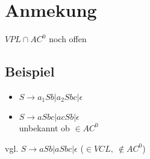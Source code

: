\section{Anmekung}
    $VPL\cap AC^0$ noch offen
    \subsection{Beispiel}
        \begin{itemize}
            \item $S\rightarrow a_1Sb|a_2Sbc|\epsilon$
            \item $S\rightarrow aSbc|acSb|\epsilon$\\
                 unbekannt ob $\in AC^0$
        \end{itemize}
        vgl. $S\rightarrow aSb|aSbc|\epsilon$ ($\in VCL,\ \not\in AC^0$)
